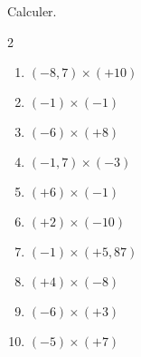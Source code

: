 \begin{exercice*}
    Calculer.
    \begin{multicols}2
        \begin{enumerate}
            \item $ (-8,7) \times  (+10) $
            \item $ (-1) \times  (-1) $
            \item $ (-6) \times  (+8) $
            \item $ (-1,7) \times  (-3) $
            \item $ (+6) \times  (-1) $
            \item $ (+2) \times  (-10) $
            \item $ (-1) \times  (+5,87) $
            \item $ (+4) \times  (-8) $
            \item $ (-6) \times  (+3) $
            \item $ (-5) \times  (+7) $            
        \end{enumerate}
    \end{multicols}
\end{exercice*}
